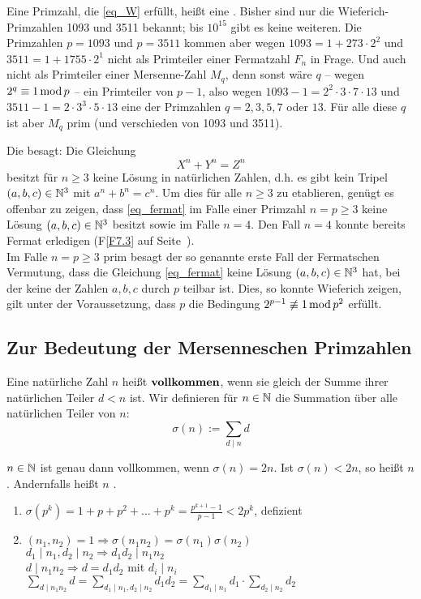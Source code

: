 Eine Primzahl, die \eqref{eq_W} erfüllt, heißt eine . Bisher sind nur die Wieferich-Primzahlen 1093 und 3511 bekannt; bis $10^{15}$ gibt es keine weiteren. Die Primzahlen $p = 1093$ und $p = 3511$ kommen aber wegen $1093 = 1 + 273 \cdot 2^2$ und $3511 = 1 + 1755 \cdot 2^1$ nicht als Primteiler einer Fermatzahl $F_n$ in Frage. Und auch nicht als Primteiler einer Mersenne-Zahl $M_q$, denn sonst wäre $q$ -- wegen $2^q \equiv 1 \operatorname{mod} p$ -- ein Primteiler von $p-1$, also wegen $1093 - 1 = 2^2 \cdot 3 \cdot 7 \cdot 13$ und $3511 - 1 = 2 \cdot 3^3 \cdot 5 \cdot 13$ eine der Primzahlen $q = 2,3,5,7$ oder $13$. Für alle diese $q$ ist aber $M_q$ prim (und verschieden von 1093 und 3511).

	Die  besagt: Die Gleichung
	\begin{equation}
		X^n + Y^n = Z^n \label{eq_fermat}
	\end{equation}
	besitzt für $n \geq 3$ keine Lösung in natürlichen Zahlen, d.h. es gibt kein Tripel $(a,b,c) \in \mathbb{N}^3$ mit $a^n+b^n=c^n$. Um dies für alle $n \geq 3$ zu etablieren, genügt es offenbar zu zeigen, dass \eqref{eq_fermat} im Falle einer Primzahl $n = p \geq 3$ keine Lösung $(a,b,c) \in \mathbb{N}^3$ besitzt sowie im Falle $n = 4$. Den Fall $n = 4$ konnte bereits Fermat erledigen (F\ref{F7.3} auf Seite~\pageref{F7.3}). \\
	Im Falle $n = p \geq 3$ prim besagt der so genannte erste Fall der Fermatschen Vermutung, dass die Gleichung \eqref{eq_fermat} keine Lösung $(a,b,c) \in \mathbb{N}^3$ hat, bei der keine der Zahlen $a,b,c$ durch $p$ teilbar ist. Dies, so konnte Wieferich zeigen, gilt unter der Voraussetzung, dass $p$ die Bedingung $2^{p-1} \not\equiv 1 \operatorname{mod} p^2$ erfüllt.

\subsection{Zur Bedeutung der Mersenneschen Primzahlen}
\begin{defn}
	Eine natürliche Zahl $n$ heißt $\Index{vollkommen}$, wenn sie gleich der Summe ihrer natürlichen Teiler $d < n$ ist. Wir definieren für $n \in \mathbb{N}$ die Summation über alle natürlichen Teiler von $n$:
	\[ \sigma(n) := \sum_{d \mid n} d \]
\end{defn}

$n \in \mathbb{N}$ ist genau dann vollkommen, wenn $\sigma(n) = 2n$. Ist $\sigma(n) < 2n$, so heißt $n$ . Andernfalls heißt $n$ .
\begin{enumerate}[(1)]
	\item $\sigma(p^k) = 1 + p + p^2 + \dots + p^k = \frac{p^{k+1}-1}{p-1} < 2p^k$, defizient
	\item $(n_1,n_2) = 1 \Rightarrow \sigma(n_1n_2) = \sigma(n_1) \sigma(n_2)$ \\
	$d_1 \mid n_1, d_2 \mid n_2 \Rightarrow d_1 d_2 \mid n_1 n_2$ \\
	$d \mid n_1 n_2 \Rightarrow d=d_1d_2$ mit $d_i \mid n_i$
	$\sum\limits_{d \mid n_1n_2} d = \sum\limits_{d_1 \mid n_1, d_2 \mid n_2} d_1d_2 = \sum\limits_{d_1 \mid n_1} d_1 \cdot \sum\limits_{d_2 \mid n_2} d_2$
\end{enumerate}

